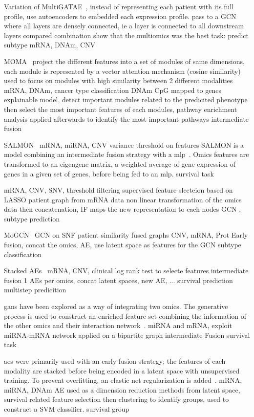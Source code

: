 \documentclass[../main.tex]{subfiles}
\begin{document}
		Variation of MultiGATAE~\cite{Zhang2022}, instead of representing each patient with its full profile, use autoencoders to embedded each expression profile.
		pass to a GCN where all layers are densely connected, ie a layer is connected to all downstream layers
		compared combination show that the multiomics was the best
		task: predict subtype
		mRNA, DNAm, CNV

		MOMA~\cite{MOMA}
		project the different features into a set of modules of same dimensions, each module is represented by a vector
		attention mechanism (cosine similarity) used to focus on modules with high similarity between 2 different modalities
		mRNA, DNAm, cancer type classification
		DNAm CpG mapped to genes
		explainable model, detect important modules related to the predicited phenotype then select the most important features of each modules, pathway enrichment analysis applied afterwards to identify the most important pathways
		intermediate fusion

		SALMON~\cite{SALMON} mRNA, miRNA, CNV
		variance threshold on features
		SALMON is a model combining an intermediate fusion strategy with a \gls{mlp}~\cite{SALMON}.
		Omics features are transformed to an eigengene matrix, a weighted average of gene expression of genes in a given set of genes, before being fed to an \gls{mlp}.
		survival task

		\cite{Yin2022} mRNA, CNV, SNV,
		threshold filtering
		supervised feature slecteion based on LASSO
		patient graph from mRNA data
		non linear transformation of the omics data then concatenation, IF
		maps the new representation to each nodes
		GCN , subtype prediction

		MoGCN~\cite{MoGCN} GCN on SNF patient similarity fused graphs
		CNV, mRNA, Prot
		Early fusion, concat the omics, AE, use latent space as features for the GCN subtype classification

		Stacked AEs~\cite{Wu2022StackedAB}
		mRNA, CNV, clinical
		log rank test to selecte features
		intermediate fusion
		1 AEs per omics, concat latent spaces, new AE, ...
		survival prediction
		multistep predicition

		\Glspl{gan} have been explored as a way of integrating two omics.
		The generative process is used to construct an enriched feature set combining the information of the other omics and their interaction network~\cite{omicsGAN}.
		miRNA and mRNA, exploit miRNA-mRNA network
		applied on a bipartite graph intermediate Fusion
		survival task

		\glspl{ae} were primarily used with an early fusion strategy; the features of each modality are stacked before being encoded in a latent space with unsupervised training.
		To prevent overfitting, an elastic net regularization is added~\cite{Chaudhary2018}.
		mRNA, miRNA, DNAm
		AE used as a dimension reduction methods
		from latent space, survival related feature selection then clustering to identify groups, used to construct a SVM classifier.
		survival group
\end{document}
